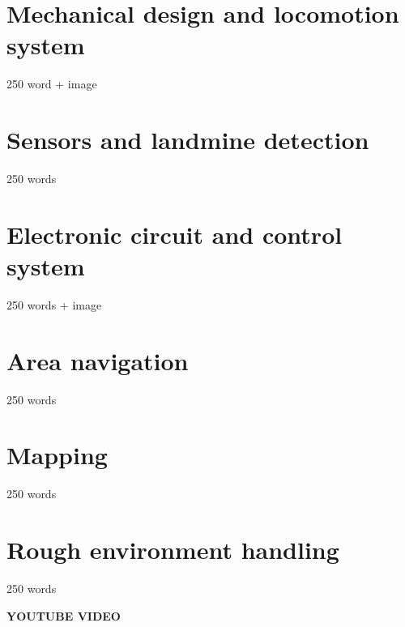 \section{Mechanical design and locomotion system}
250 word + image

\section{Sensors and landmine detection}
250 words

\section{Electronic circuit and control system}
250 words + image

\section{Area navigation}
250 words

\section{Mapping}

250 words

\section{Rough environment handling}

250 words

\textbf{YOUTUBE VIDEO}
